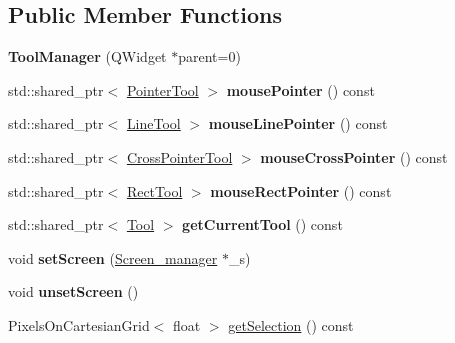 \subsection*{Public Member Functions}
\begin{DoxyCompactItemize}
\item 
\mbox{\label{classToolManager_a545deb9764ae2e7a3f400c5cbb39ad97}} 
{\bfseries Tool\+Manager} (Q\+Widget $\ast$parent=0)
\item 
\mbox{\label{classToolManager_af014405a887ece8d7f1b9f615cf23ba9}} 
std\+::shared\+\_\+ptr$<$ \mbox{\hyperlink{classPointerTool}{Pointer\+Tool}} $>$ {\bfseries mouse\+Pointer} () const
\item 
\mbox{\label{classToolManager_aa3d042011bef91da4b62abba3ed57bf5}} 
std\+::shared\+\_\+ptr$<$ \mbox{\hyperlink{classLineTool}{Line\+Tool}} $>$ {\bfseries mouse\+Line\+Pointer} () const
\item 
\mbox{\label{classToolManager_ac41a1125038d46a2f58340a7c4618b29}} 
std\+::shared\+\_\+ptr$<$ \mbox{\hyperlink{classCrossPointerTool}{Cross\+Pointer\+Tool}} $>$ {\bfseries mouse\+Cross\+Pointer} () const
\item 
\mbox{\label{classToolManager_a30041d36e599e0eb5026130c4bfede93}} 
std\+::shared\+\_\+ptr$<$ \mbox{\hyperlink{classRectTool}{Rect\+Tool}} $>$ {\bfseries mouse\+Rect\+Pointer} () const
\item 
\mbox{\label{classToolManager_ab7e6dfe68ed07dc91dbfafc2c12f4621}} 
std\+::shared\+\_\+ptr$<$ \mbox{\hyperlink{classTool}{Tool}} $>$ {\bfseries get\+Current\+Tool} () const
\item 
\mbox{\label{classToolManager_acf037bd364532b9bf2dec9564ec630f7}} 
void {\bfseries set\+Screen} (\mbox{\hyperlink{classScreen__manager}{Screen\+\_\+manager}} $\ast$\+\_\+s)
\item 
\mbox{\label{classToolManager_a3f3257e4c8d3cc407b734438a99dba3e}} 
void {\bfseries unset\+Screen} ()
\item 
Pixels\+On\+Cartesian\+Grid$<$ float $>$ \mbox{\hyperlink{classToolManager_a2b92398db6ca45c14b28bc54fbe4d64a}{get\+Selection}} () const
\end{DoxyCompactItemize}
